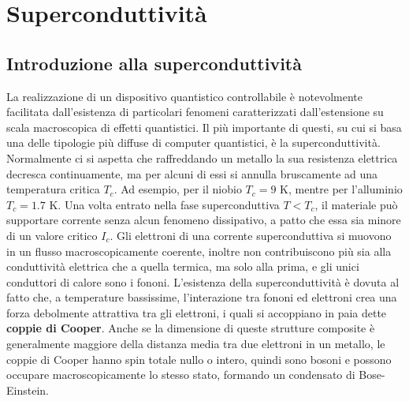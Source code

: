 \chapter{Superconduttività}

\section{Introduzione alla superconduttività}
La realizzazione di un dispositivo quantistico controllabile è notevolmente facilitata dall'esistenza di particolari fenomeni caratterizzati dall'estensione su scala macroscopica di effetti quantistici. Il più importante di questi, su cui si basa una delle tipologie più diffuse di computer quantistici, è la superconduttività. Normalmente ci si aspetta che raffreddando un metallo la sua resistenza elettrica decresca continuamente, ma per alcuni di essi si annulla bruscamente ad una temperatura critica $T_c$. Ad esempio, per il niobio $T_c=9\text{ K}$, mentre per l'alluminio $T_c=1.7\text{ K}$. Una volta entrato nella fase superconduttiva $T<T_c$, il materiale può supportare corrente senza alcun fenomeno dissipativo, a patto che essa sia minore di un valore critico $I_c$. Gli elettroni di una corrente superconduttiva si muovono in un flusso macroscopicamente coerente, inoltre non contribuiscono più sia alla conduttività elettrica che a quella termica, ma solo alla prima, e gli unici conduttori di calore sono i fononi. L'esistenza della superconduttività è dovuta al fatto che, a temperature bassissime, l'interazione tra fononi ed elettroni crea una forza debolmente attrattiva tra gli elettroni, i quali si accoppiano in paia dette \textbf{coppie di Cooper}. Anche se la dimensione di queste strutture composite è generalmente maggiore della distanza media tra due elettroni in un metallo, le coppie di Cooper hanno spin totale nullo o intero, quindi sono bosoni e possono occupare macroscopicamente lo stesso stato, formando un condensato di Bose-Einstein.

